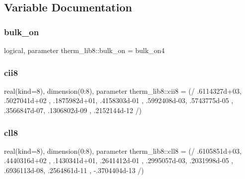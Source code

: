 \subsection{Variable Documentation}
\mbox{\label{namespacetherm__lib8_aa2d5118204fcd26e0603d47b2bd1a48c}} 
\subsubsection{\texorpdfstring{bulk\+\_\+on}{bulk\_on}}
{\footnotesize\ttfamily logical, parameter therm\+\_\+lib8\+::bulk\+\_\+on = bulk\+\_\+on4}

\mbox{\label{namespacetherm__lib8_aa9cd8b30beb20347cc9a45f40fd72baa}} 
\subsubsection{\texorpdfstring{cii8}{cii8}}
{\footnotesize\ttfamily real(kind=8), dimension(0\+:8), parameter therm\+\_\+lib8\+::cii8 = (/ .\+6114327d+03, .\+5027041d+02 , .\+1875982d+01, .\+4158303d-\/01 , .\+5992408d-\/03, .\+5743775d-\/05 , .\+3566847d-\/07, .\+1306802d-\/09 , .\+2152144d-\/12 /)}

\mbox{\label{namespacetherm__lib8_a1f1e0a0dd53bbaf4515bc58ada29dba7}} 
\subsubsection{\texorpdfstring{cll8}{cll8}}
{\footnotesize\ttfamily real(kind=8), dimension(0\+:8), parameter therm\+\_\+lib8\+::cll8 = (/ .\+6105851d+03, .\+4440316d+02 , .\+1430341d+01, .\+2641412d-\/01 , .\+2995057d-\/03, .\+2031998d-\/05 , .\+6936113d-\/08, .\+2564861d-\/11 , -\/.\+3704404d-\/13 /)}

\mbox{\label{namespacetherm__lib8_a826524c63660fd35bee5d07fa43c19e0}} 
